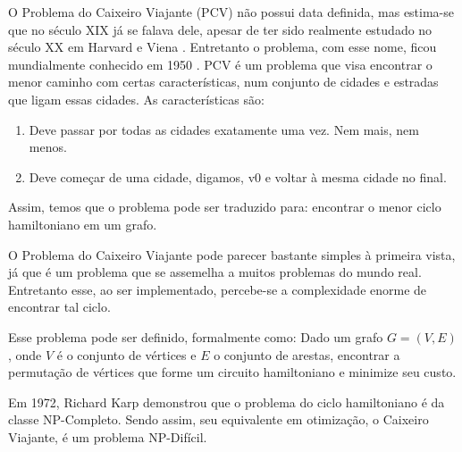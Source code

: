 O Problema do Caixeiro Viajante (PCV) não possui data definida, mas estima-se que no século XIX já se falava dele, apesar de ter sido realmente estudado no século XX em Harvard e Viena \cite{PCVWikipedia}. Entretanto o problema, com esse nome, ficou mundialmente conhecido em 1950 \cite{Applegate}. PCV é um problema que visa encontrar o menor caminho com certas características, num conjunto de cidades e estradas que ligam essas cidades. As características são:

	\begin{enumerate}
		\item Deve passar por todas as cidades exatamente uma vez. Nem mais, nem menos.
        \item Deve começar de uma cidade, digamos, v0 e voltar à mesma cidade no final.
	\end{enumerate}
    
    Assim, temos que o problema pode ser traduzido para: encontrar o menor ciclo hamiltoniano em um grafo.
    
    O Problema do Caixeiro Viajante pode parecer bastante simples à primeira vista, já que é um problema que se assemelha a muitos problemas do mundo real. Entretanto esse, ao ser implementado, percebe-se a complexidade enorme de encontrar tal ciclo.
    
     Esse problema pode ser definido, formalmente como: Dado um grafo $G = (V,E)$, onde $V$ é o conjunto de vértices e $E$ o conjunto de arestas, encontrar a permutação de vértices que forme um circuito hamiltoniano e minimize seu custo.
    
    Em 1972, Richard Karp demonstrou que o problema do ciclo hamiltoniano é da classe NP-Completo\cite{karp1972}. Sendo assim, seu equivalente em otimização, o Caixeiro Viajante, é um problema NP-Difícil.